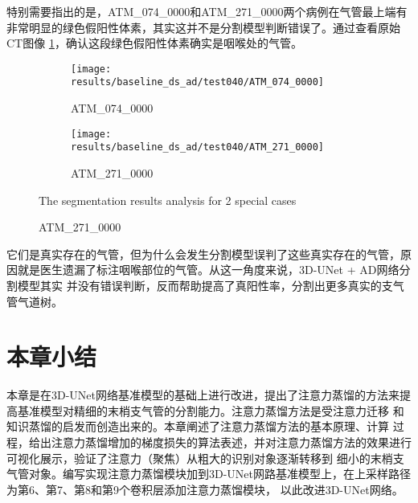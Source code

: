 特别需要指出的是，ATM\_074\_0000和ATM\_271\_0000两个病例在气管最上端有非常明显的绿色假阳性体素，其实这并不是分割模型判断错误了。通过查看原始CT图像
\ref{fig:two_special_cases}，确认这段绿色假阳性体素确实是咽喉处的气管。
\begin{figure}[htp]
	\centering
	\begin{subfigure}{0.48\textwidth}
		\texttt{[image: results/baseline\_ds\_ad/test040/ATM\_074\_0000]}
		\caption{ATM\_074\_0000}
	\end{subfigure}
	\hfill
	\begin{subfigure}{0.48\textwidth}
		\texttt{[image: results/baseline\_ds\_ad/test040/ATM\_271\_0000]}
		\caption{ATM\_271\_0000}
	\end{subfigure}
        {The segmentation results analysis for 2 special cases}
	\label{fig:two_special_cases}
\end{figure}
它们是真实存在的气管，但为什么会发生分割模型误判了这些真实存在的气管，原因就是医生遗漏了标注咽喉部位的气管。从这一角度来说，3D-UNet + AD网络分割模型其实
并没有错误判断，反而帮助提高了真阳性率，分割出更多真实的支气管气道树。

\section{本章小结}

本章是在3D-UNet网络基准模型的基础上进行改进，提出了注意力蒸馏的方法来提高基准模型对精细的末梢支气管的分割能力。注意力蒸馏方法是受注意力迁移
\cite{Zagoruyko2016PayingMA}和知识蒸馏\cite{Hinton2015DistillingTK}的启发而创造出来的。本章阐述了注意力蒸馏方法的基本原理、计算
过程，给出注意力蒸馏增加的梯度损失的算法表述，并对注意力蒸馏方法的效果进行可视化展示，验证了注意力（聚焦）从粗大的识别对象逐渐转移到
细小的末梢支气管对象。编写实现注意力蒸馏模块加到3D-UNet网路基准模型上，在上采样路径为第6、第7、第8和第9个卷积层添加注意力蒸馏模块，
以此改进3D-UNet网络。

